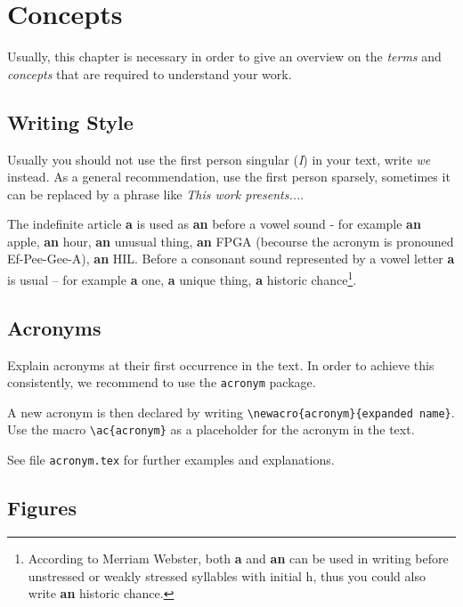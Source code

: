 
\chapter{Concepts} \label{chapter:concepts}

Usually, this chapter is necessary in order to give an overview on
the \emph{terms} and \emph{concepts} that are required to understand
your work.

\section{Writing Style}

Usually you should not use the first person singular (\emph{I}) in
your text, write \emph{we} instead. As a general recommendation, use
the first person sparsely, sometimes it can be replaced by a phrase
like \emph{This work presents...}.

The indefinite article \textbf{a} is used as \textbf{an} before a
vowel sound - for example \textbf{an} apple, \textbf{an} hour,
\textbf{an} unusual thing, \textbf{an} FPGA (becourse the acronym is
pronouned Ef-Pee-Gee-A), \textbf{an} HIL. Before a consonant sound
represented by a vowel letter \textbf{a} is usual -- for example
\textbf{a} one, \textbf{a} unique thing, \textbf{a} historic
chance\footnote{According to Merriam Webster, both \textbf{a} and
\textbf{an} can be used in writing before unstressed or weakly
stressed syllables with initial h, thus you could also write
\textbf{an} historic chance.}.

\section{Acronyms}

Explain acronyms at their first occurrence in the text. In order to
achieve this consistently, we recommend to use the \texttt{acronym}
package.

A new acronym is then declared by writing
\verb+\newacro{acronym}{expanded name}+. Use the macro
\verb+\ac{acronym}+ as a placeholder for the acronym in the text.

See file \texttt{acronym.tex} for further examples and explanations.


\section{Figures}

